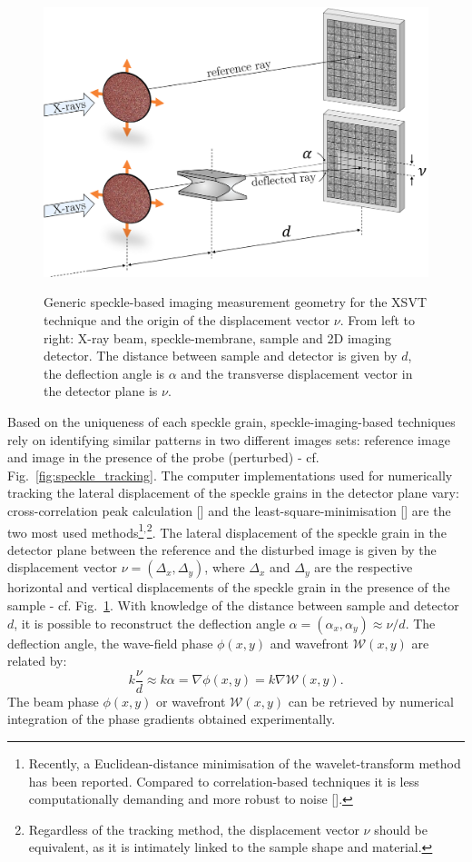 \begin{refsection}
\begin{figure}[t]
        \centering
        {\includegraphics[width=0.6\linewidth]{figures/ch04/speckle_tracking2.png}}
        \caption[Speckle-based imaging geometry]{Generic speckle-based imaging measurement geometry for the XSVT technique and the origin of the displacement vector $\nu$. From left to right: X-ray beam, speckle-membrane, sample and 2D imaging detector. The distance between sample and detector is given by $d$, the deflection angle is $\alpha$ and the transverse displacement vector in the detector plane is $\nu$.} \label{fig:speckle_tracking2}
\end{figure}

Based on the uniqueness of each speckle grain, speckle-imaging-based techniques rely on identifying similar patterns in two different images sets: reference image and image in the presence of the probe (perturbed) - cf. Fig.~\ref{fig:speckle_tracking}. The computer implementations used for numerically tracking the lateral displacement of the speckle grains in the detector plane vary: cross-correlation peak calculation [\cite{Berujon2012, Morgan2012}] and the least-square-minimisation [\cite{Zanette2014, Zdora2017}] are the two most used methods\footnote{Recently, a Euclidean-distance minimisation of the wavelet-transform method has been reported. Compared to correlation-based techniques it is less computationally demanding and more robust to noise [\cite{Qiao2020b}].}$^{,}$\footnote{Regardless of the tracking method, the displacement vector $\nu$ should be equivalent, as it is intimately linked to the sample shape and material.}. The lateral displacement of the speckle grain in the detector plane between the reference and the disturbed image is given by the displacement vector $\nu=(\Delta_x,\Delta_y)$, where $\Delta_x$ and $\Delta_y$ are the respective horizontal and vertical displacements of the speckle grain in the presence of the sample - cf. Fig.~\ref{fig:speckle_tracking2}. With knowledge of the distance between sample and detector $d$, it is possible to reconstruct the deflection angle $\alpha=(\alpha_x,\alpha_y)\approx\nu/d$. The deflection angle, the wave-field phase $\phi(x,y)$ and wavefront $\mathcal{W}(x,y)$ are related by:
\begin{equation}\label{eq:wavefront_gradient}
    k\frac{\nu}{d} \approx k \alpha = \nabla\phi(x,y) = k \nabla\mathcal{W}(x,y).
\end{equation}
The beam phase $\phi(x,y)$ or wavefront $\mathcal{W}(x,y)$ can be retrieved by numerical integration of the phase gradients obtained experimentally.


\end{refsection}
